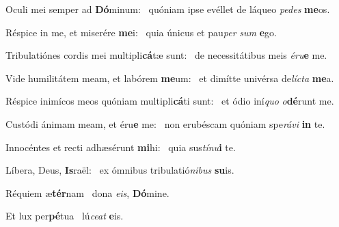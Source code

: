 \item Oculi mei semper ad \textbf{Dó}minum:~\psstar{} quóniam ipse evéllet de láqueo \textit{pedes} \textbf{me}os.

\item Réspice in me, et miserére \textbf{me}i:~\psstar{} quia únicus et pau\textit{per} \textit{sum} \textbf{e}go.

\item Tribulatiónes cordis mei multipli\textbf{cá}tæ sunt:~\psstar{} de necessitátibus meis \textit{éru}\textbf{e} me.

\item Vide humilitátem meam, et labórem \textbf{me}um:~\psstar{} et dimítte univérsa de\textit{lícta} \textbf{me}a.

\item Réspice inimícos meos quóniam multipli\textbf{cá}ti sunt:~\psstar{} et ódio iní\textit{quo} \textit{o}\textbf{dé}runt me.

\item Custódi ánimam meam, et éru\textbf{e} me:~\psstar{} non erubéscam quóniam spe\textit{rávi} \textbf{in} te.

\item Innocéntes et recti adhæsérunt \textbf{mi}hi:~\psstar{} quia sus\textit{tínu}\textbf{i} te.

\item Líbera, Deus, \textbf{Is}raël:~\psstar{} ex ómnibus tribulatió\textit{nibus} \textbf{su}is.

\item Réquiem æ\textbf{tér}nam~\psstar{} dona \textit{eis}, \textbf{Dó}mine.

\item Et lux per\textbf{pé}tua~\psstar{} lú\textit{ceat} \textbf{e}is.